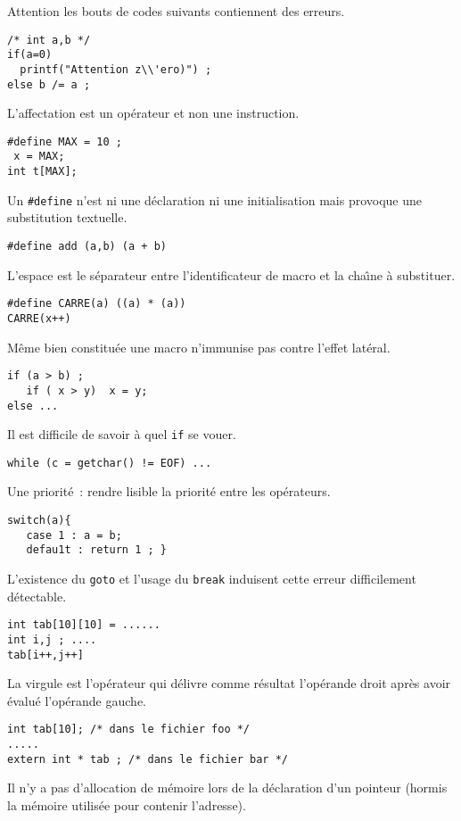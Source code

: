 \begin{frame}
Attention les bouts de codes suivants contiennent des erreurs.
\begin{verbatim}
/* int a,b */
if(a=0) 
  printf("Attention z\\'ero)") ;
else b /= a ;
\end{verbatim}
  L'affectation est un op\'erateur et non une instruction.
\begin{verbatim}
#define MAX = 10 ;
 x = MAX;
int t[MAX];
\end{verbatim}
  Un \verb?#define? n'est ni une d\'eclaration ni une initialisation
  mais provoque une substitution textuelle.
\begin{verbatim}
#define add (a,b) (a + b)
\end{verbatim}
  L'espace est le s\'eparateur entre l'identificateur de macro et la
  cha\^\i{}ne \`a substituer.
\newpage
\begin{verbatim}
#define CARRE(a) ((a) * (a))
CARRE(x++) 
\end{verbatim}
M\^eme bien constitu\'ee une macro n'immunise pas contre l'effet lat\'eral.
\begin{verbatim}
if (a > b) ;
   if ( x > y)  x = y;
else ...
\end{verbatim}
Il est difficile de savoir \`a quel \verb?if? se vouer.
\begin{verbatim}
while (c = getchar() != EOF) ...
\end{verbatim}
Une priorit\'e~: rendre lisible la priorit\'e entre les op\'erateurs.
\begin{verbatim}
switch(a){
   case 1 : a = b;
   defau1t : return 1 ; }
\end{verbatim}
L'existence du \verb?goto? et l'usage du \verb?break? induisent cette
erreur difficilement d\'etectable.
\newpage
\begin{verbatim}
int tab[10][10] = ......
int i,j ; ....
tab[i++,j++]
\end{verbatim}
La   virgule   est   l'op\'erateur  qui  d\'elivre   comme  r\'esultat
l'op\'erande droit apr\`es avoir \'evalu\'e l'op\'erande gauche.
\begin{verbatim}
int tab[10]; /* dans le fichier foo */
.....
extern int * tab ; /* dans le fichier bar */
\end{verbatim}
Il n'y a pas d'allocation de m\'emoire lors de la d\'eclaration d'un
pointeur (hormis la m\'emoire utilis\'ee pour contenir l'adresse).

\end{frame}
